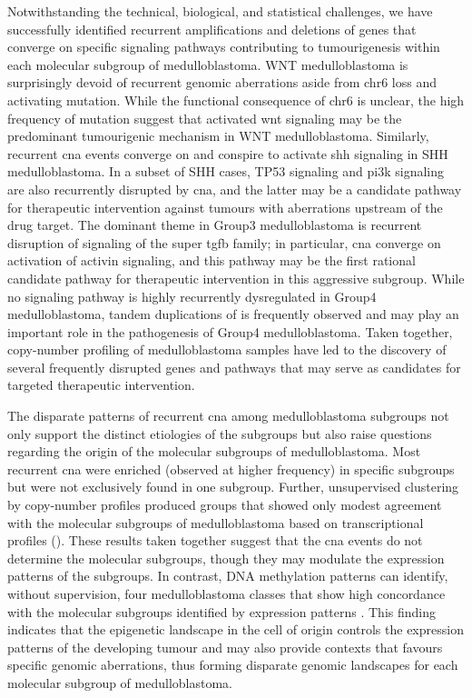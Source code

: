 Notwithstanding the technical, biological, and statistical challenges, we have successfully identified recurrent amplifications and deletions of genes that converge on specific signaling pathways contributing to tumourigenesis within each molecular subgroup of medulloblastoma. WNT medulloblastoma is surprisingly devoid of recurrent genomic aberrations aside from chr6 loss and  activating mutation. While the functional consequence of chr6 is unclear, the high frequency of  mutation suggest that activated \gls{wnt} signaling may be the predominant tumourigenic mechanism in WNT medulloblastoma. Similarly, recurrent \gls{cna} events converge on and conspire to activate \gls{shh} signaling in SHH medulloblastoma. In a subset of SHH cases, TP53 signaling and \gls{pi3k} signaling are also recurrently disrupted by \gls{cna}, and the latter may be a candidate pathway for therapeutic intervention against tumours with aberrations upstream of the drug target. The dominant theme in Group3 medulloblastoma is recurrent disruption of signaling of the super \gls{tgfb} family; in particular, \gls{cna} converge on activation of activin signaling, and this pathway may be the first rational candidate pathway for therapeutic intervention in this aggressive subgroup. While no signaling pathway is highly recurrently dysregulated in Group4 medulloblastoma, tandem duplications of  is frequently observed and may play an important role in the pathogenesis of Group4 medulloblastoma. Taken together, copy-number profiling of medulloblastoma samples have led to the discovery of several frequently disrupted genes and pathways that may serve as candidates for targeted therapeutic intervention.

The disparate patterns of recurrent \gls{cna} among medulloblastoma subgroups not only support the distinct etiologies of the subgroups but also raise questions regarding the origin of the molecular subgroups of medulloblastoma. Most recurrent \gls{cna} were enriched (observed at higher frequency) in specific subgroups but were not exclusively found in one subgroup. Further, unsupervised clustering by copy-number profiles produced groups that showed only modest agreement with the molecular subgroups of medulloblastoma based on transcriptional profiles (). These results taken together suggest that the \gls{cna} events do not determine the molecular subgroups, though they may modulate the expression patterns of the subgroups. In contrast, DNA methylation patterns can identify, without supervision, four medulloblastoma classes that show high concordance with the molecular subgroups identified by expression patterns . This finding indicates that the epigenetic landscape in the cell of origin controls the expression patterns of the developing tumour and may also provide contexts that favours specific genomic aberrations, thus forming disparate genomic landscapes for each molecular subgroup of medulloblastoma.


